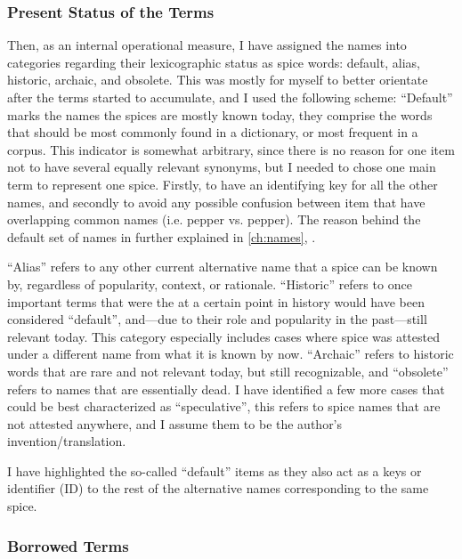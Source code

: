 \subsubsection{Present Status of the Terms}

Then, as an internal operational measure, I have assigned the names into categories regarding their lexicographic status as spice words: default, alias, historic, archaic, and obsolete. This was mostly for myself to better orientate after the terms started to accumulate, and I used the following scheme: ``Default'' marks the names the spices are mostly known today, they comprise the words that should be most commonly found in a dictionary, or most frequent in a corpus. This indicator is somewhat arbitrary, since there is no reason for one item not to have several equally relevant synonyms, but I needed to chose one main term to represent one spice. Firstly, to have an identifying key for all the other names, and secondly to avoid any possible confusion between item that have overlapping common names (i.e. pepper vs. pepper). The reason behind the default set of names in further explained in \cref{ch:names}, .

``Alias'' refers to any other current alternative name that a spice can be known by, regardless of popularity, context, or rationale. ``Historic'' refers to once important terms that were the at a certain point in history would have been considered ``default'', and---due to their role and popularity in the past---still relevant today. This category especially includes cases where spice was attested under a different name from what it is known by now. ``Archaic'' refers to historic words that are rare and not relevant today, but still recognizable, and ``obsolete'' refers to names that are essentially dead.
I have identified a few more cases that could be best characterized as ``speculative'', this refers to spice names that are not attested anywhere, and I assume them to be the author's invention/translation. 

I have highlighted the so-called ``default'' items as they also act as a keys or identifier (ID) to the rest of the alternative names corresponding to the same spice.

\subsubsection{Borrowed Terms}

